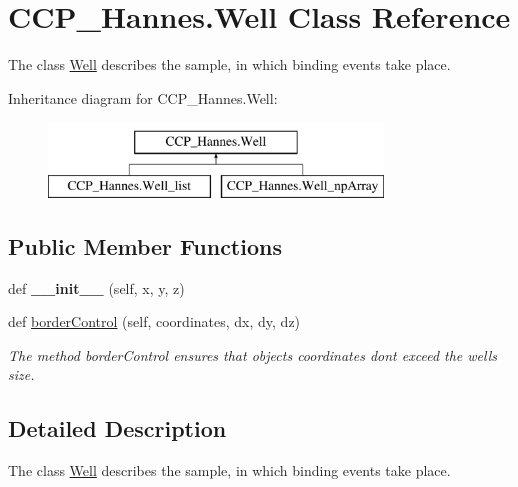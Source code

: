 \hypertarget{class_c_c_p___hannes_1_1_well}{}\section{C\+C\+P\+\_\+\+Hannes.\+Well Class Reference}
\label{class_c_c_p___hannes_1_1_well}


The class \mbox{\hyperlink{class_c_c_p___hannes_1_1_well}{Well}} describes the sample, in which binding events take place.  


Inheritance diagram for C\+C\+P\+\_\+\+Hannes.\+Well\+:\begin{figure}[H]
\begin{center}
\leavevmode
\includegraphics[height=2.000000cm]{class_c_c_p___hannes_1_1_well}
\end{center}
\end{figure}
\subsection*{Public Member Functions}
\begin{DoxyCompactItemize}
\item 
\mbox{\label{class_c_c_p___hannes_1_1_well_a3149734033aad29ad56cca89fd2b8580}} 
def {\bfseries \+\_\+\+\_\+init\+\_\+\+\_\+} (self, x, y, z)
\item 
def \mbox{\hyperlink{class_c_c_p___hannes_1_1_well_ae595041538a36438fa0ff796a1e24d4c}{border\+Control}} (self, coordinates, dx, dy, dz)
\begin{DoxyCompactList}\small\item\em The method border\+Control ensures that objects\textquotesingle{} coordinates don\textquotesingle{}t exceed the well\textquotesingle{}s size. \end{DoxyCompactList}\end{DoxyCompactItemize}


\subsection{Detailed Description}
The class \mbox{\hyperlink{class_c_c_p___hannes_1_1_well}{Well}} describes the sample, in which binding events take place. 

